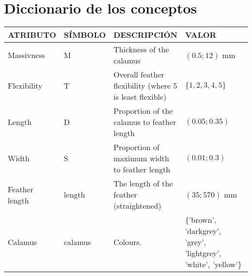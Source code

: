 \documentclass[a4paper,12pt]{article}
\begin{document}
\section{Diccionario de los conceptos}
\begin{table}[H]
	\begin{tabular}{|p{0.2\linewidth}|p{0.15\linewidth}|p{0.25\linewidth}|p{0.45\linewidth}|}
		\hline
		ATRIBUTO       & SÍMBOLO      & DESCRIPCIÓN                                   & VALOR                                                                                                                                                                                                                           \\ \hline\hline
		Massivness     & M            & Thickness of the calamus                      & $(0.5;12)$ mm                                                                                                                                                                                                                 \\ \hline
		Flexibility    & T            & Overall feather flexibility (where 5 is least flexible)             & $\{1,2,3,4,5\}$                                                                                                                                                                                                                 \\ \hline
		Length         & D            & Proportion of the calamus to feather length   & $(0.05;0.35)$                                                                                                                                                                                                                     \\ \hline
		Width          & S            & Proportion of maximum width to feather length & $(0.01;0.3)$                                                                                                                                                                                                                     \\ \hline
		Feather length & length       & The length of the feather (straightened)      & $(35;570)$ mm                                                                                                                                                                                                                   \\ \hline
		Calamus        & calamus      & Colours.                                      & \{'brown', 'darkgrey', 'grey', 'lightgrey', 'white', 'yellow'\}                                                                                                                                                                 \\ \hline

\end{tabular}
\end{table}
\end{document}
